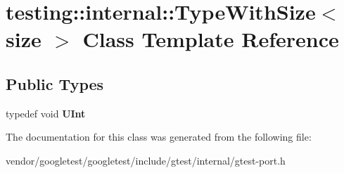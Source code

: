 \hypertarget{classtesting_1_1internal_1_1TypeWithSize}{}\section{testing\+:\+:internal\+:\+:Type\+With\+Size$<$ size $>$ Class Template Reference}
\label{classtesting_1_1internal_1_1TypeWithSize}
\subsection*{Public Types}
\begin{DoxyCompactItemize}
\item 
typedef void {\bfseries U\+Int}\hypertarget{classtesting_1_1internal_1_1TypeWithSize_a3898640d9f6c1e18110eef90f47a5d7b}{}\label{classtesting_1_1internal_1_1TypeWithSize_a3898640d9f6c1e18110eef90f47a5d7b}

\end{DoxyCompactItemize}


The documentation for this class was generated from the following file\+:\begin{DoxyCompactItemize}
\item 
vendor/googletest/googletest/include/gtest/internal/gtest-\/port.\+h\end{DoxyCompactItemize}
